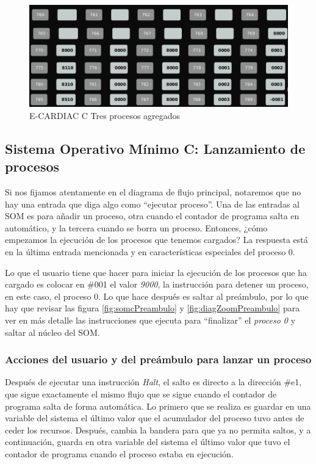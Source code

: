 \documentclass[letterpaper,12pt,oneside]{book}
\begin{document}
		
		\begin{figure}[h]		
			\centering
			\includegraphics[scale=0.45]{media/CARDIACC/eccZP3procesosadded.png}
			\caption{E-CARDIAC C Tres procesos agregados }
			\label{fig:eccTresProcessoAgregados}
		\end{figure}					
		
		\clearpage
		
		\subsection{Sistema Operativo Mínimo C: Lanzamiento de procesos}
  
		
		
		Si nos fijamos atentamente en el diagrama de flujo principal, notaremos que no hay una entrada que diga algo como ``ejecutar proceso''. 
		Una
		de las entradas al SOM es para añadir un proceso, otra cuando el contador de programa salta en automático, y la tercera cuando se borra
		un proceso. Entonces, ¿cómo empezamos la ejecución de los procesos que tenemos cargados? La respuesta está en la última entrada mencionada y
		en características especiales del proceso 0. 
		
		Lo que el usuario tiene que hacer para iniciar la ejecución de los procesos
		que ha cargado es colocar en \#001 el valor \textit{9000}, la instrucción para detener un proceso, en este caso, el proceso 0. Lo que hace 
		después
		es saltar al preámbulo, por lo que hay que revisar las figura \ref{fig:somcPreambulo}
		y \ref{fig:diagZoomPreambulo} para ver en más detalle las instrucciones que ejecuta para ``finalizar''
		el \textit{proceso 0} y saltar al núcleo del SOM.
		
		\subsubsection{Acciones del usuario y del preámbulo para lanzar un proceso}
  
		Después de ejecutar una instrucción \textit{Halt}, el salto es directo a la
		dirección \#e1, que sigue exactamente el mismo flujo que se sigue cuando el contador de programa salta de forma automática. Lo primero
		que se realiza es guardar en una variable del sistema el último valor que el acumulador del proceso tuvo antes de ceder los recursos. Después, 
		cambia la bandera 
		para que 
		ya no permita 
		saltos, y a continuación, guarda en otra variable del sistema el último valor que tuvo el contador de programa cuando
		el proceso estaba en ejecución. 
		
\end{document}
